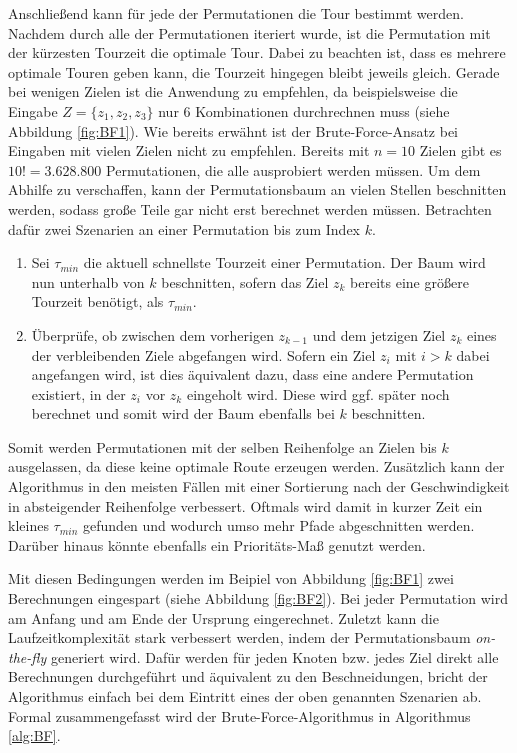 \documentclass[german,version-2019-11]{uzl-thesis}
\begin{document}
Anschließend kann für jede der Permutationen die Tour bestimmt werden. Nachdem durch alle der Permutationen iteriert wurde, ist die Permutation mit der kürzesten Tourzeit die optimale Tour. Dabei zu beachten ist, dass es mehrere optimale Touren geben kann, die Tourzeit hingegen bleibt jeweils gleich. Gerade bei wenigen Zielen ist die Anwendung zu empfehlen, da beispielsweise die Eingabe $Z=\{z_1, z_2, z_3\}$ nur 6 Kombinationen durchrechnen muss (siehe Abbildung \ref{fig:BF1}). Wie bereits erwähnt ist der Brute-Force-Ansatz bei Eingaben mit vielen Zielen nicht zu empfehlen. Bereits mit $n=10$ Zielen gibt es $10! = 3.628.800$ Permutationen, die alle ausprobiert werden müssen. Um dem Abhilfe zu verschaffen, kann der Permutationsbaum an vielen Stellen beschnitten werden, sodass große Teile gar nicht erst berechnet werden müssen. Betrachten dafür zwei Szenarien an einer Permutation bis zum Index $k$.
\begin{enumerate}
\item
Sei $\tau_{min}$ die aktuell schnellste Tourzeit einer Permutation. Der Baum wird nun unterhalb von $k$ beschnitten, sofern das Ziel $z_k$ bereits eine größere Tourzeit benötigt, als $\tau_{min}$. 

\item
Überprüfe, ob zwischen dem vorherigen $z_{k-1}$ und dem jetzigen Ziel $z_{k}$ eines der verbleibenden Ziele abgefangen wird. Sofern ein Ziel $z_{i} \text{ mit } i>k$ dabei angefangen wird, ist dies äquivalent dazu, dass eine andere Permutation existiert, in der $z_i$ vor $z_k$ eingeholt wird. Diese wird ggf. später noch berechnet und somit wird der Baum ebenfalls bei $k$ beschnitten.
\end{enumerate} 
Somit werden Permutationen mit der selben Reihenfolge an Zielen bis $k$ ausgelassen, da diese keine optimale Route erzeugen werden. Zusätzlich kann der Algorithmus in den meisten Fällen mit einer Sortierung nach der Geschwindigkeit in absteigender Reihenfolge verbessert. Oftmals wird damit in kurzer Zeit ein kleines $\tau_{min}$ gefunden und wodurch umso mehr Pfade abgeschnitten werden. Darüber hinaus könnte ebenfalls ein Prioritäts-Maß genutzt werden. 

Mit diesen Bedingungen werden im Beipiel von Abbildung \ref{fig:BF1} zwei Berechnungen eingespart (siehe Abbildung \ref{fig:BF2}). Bei jeder Permutation wird am Anfang und am Ende der Ursprung eingerechnet. Zuletzt kann die Laufzeitkomplexität stark verbessert werden, indem der Permutationsbaum \emph{on-the-fly} generiert wird. Dafür werden für jeden Knoten bzw. jedes Ziel direkt alle Berechnungen durchgeführt und äquivalent zu den Beschneidungen, bricht der Algorithmus einfach bei dem Eintritt eines der oben genannten Szenarien ab. Formal zusammengefasst wird der Brute-Force-Algorithmus in Algorithmus \ref{alg:BF}. \\
\end{document}
